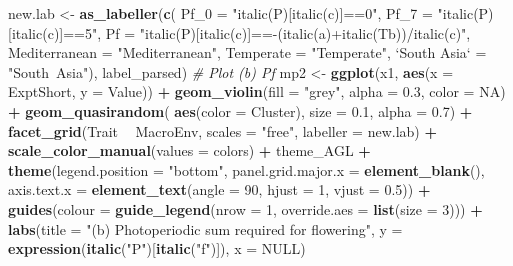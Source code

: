 \documentclass[
]{article}
\newenvironment{Shaded}{\begin{snugshade}}{\end{snugshade}}
\newcommand{\CommentTok}[1]{\textcolor[rgb]{0.56,0.35,0.01}{\textit{#1}}}
\newcommand{\DataTypeTok}[1]{\textcolor[rgb]{0.13,0.29,0.53}{#1}}
\newcommand{\DecValTok}[1]{\textcolor[rgb]{0.00,0.00,0.81}{#1}}
\newcommand{\FloatTok}[1]{\textcolor[rgb]{0.00,0.00,0.81}{#1}}
\newcommand{\KeywordTok}[1]{\textcolor[rgb]{0.13,0.29,0.53}{\textbf{#1}}}
\newcommand{\NormalTok}[1]{#1}
\newcommand{\OperatorTok}[1]{\textcolor[rgb]{0.81,0.36,0.00}{\textbf{#1}}}
\newcommand{\OtherTok}[1]{\textcolor[rgb]{0.56,0.35,0.01}{#1}}
\newcommand{\StringTok}[1]{\textcolor[rgb]{0.31,0.60,0.02}{#1}}
\begin{document}
\begin{Shaded}
\begin{Highlighting}[]
{{{{{{{{{\NormalTok{new.lab <-}\StringTok{ }\KeywordTok{as_labeller}\NormalTok{(}\KeywordTok{c}\NormalTok{(}
  \DataTypeTok{Pf_0 =} \StringTok{"italic(P)[italic(c)]==0"}\NormalTok{, }\DataTypeTok{Pf_7 =} \StringTok{"italic(P)[italic(c)]==5"}\NormalTok{,}
  \DataTypeTok{Pf =} \StringTok{"italic(P)[italic(c)]==-(italic(a)+italic(Tb))/italic(c)"}\NormalTok{,}
  \DataTypeTok{Mediterranean =} \StringTok{"Mediterranean"}\NormalTok{, }\DataTypeTok{Temperate =} \StringTok{"Temperate"}\NormalTok{, }
  \StringTok{`}\DataTypeTok{South Asia}\StringTok{`}\NormalTok{ =}\StringTok{ "South~Asia"}\NormalTok{), label_parsed)}
\CommentTok{# Plot (b) Pf}
\NormalTok{mp2 <-}\StringTok{ }\KeywordTok{ggplot}\NormalTok{(x1, }\KeywordTok{aes}\NormalTok{(}\DataTypeTok{x =}\NormalTok{ ExptShort, }\DataTypeTok{y =}\NormalTok{ Value)) }\OperatorTok{+}
\StringTok{  }\KeywordTok{geom_violin}\NormalTok{(}\DataTypeTok{fill =} \StringTok{"grey"}\NormalTok{, }\DataTypeTok{alpha =} \FloatTok{0.3}\NormalTok{, }\DataTypeTok{color =} \OtherTok{NA}\NormalTok{) }\OperatorTok{+}\StringTok{ }
\StringTok{  }\KeywordTok{geom_quasirandom}\NormalTok{( }\KeywordTok{aes}\NormalTok{(}\DataTypeTok{color =}\NormalTok{ Cluster), }\DataTypeTok{size =} \FloatTok{0.1}\NormalTok{, }\DataTypeTok{alpha =} \FloatTok{0.7}\NormalTok{) }\OperatorTok{+}\StringTok{ }
\StringTok{  }\KeywordTok{facet_grid}\NormalTok{(Trait }\OperatorTok{~}\StringTok{ }\NormalTok{MacroEnv, }\DataTypeTok{scales =} \StringTok{"free"}\NormalTok{, }\DataTypeTok{labeller =}\NormalTok{ new.lab) }\OperatorTok{+}
\StringTok{  }\KeywordTok{scale_color_manual}\NormalTok{(}\DataTypeTok{values =}\NormalTok{ colors) }\OperatorTok{+}
\StringTok{  }\NormalTok{theme_AGL }\OperatorTok{+}
\StringTok{  }\KeywordTok{theme}\NormalTok{(}\DataTypeTok{legend.position =} \StringTok{"bottom"}\NormalTok{,}
        \DataTypeTok{panel.grid.major.x =} \KeywordTok{element_blank}\NormalTok{(),}
        \DataTypeTok{axis.text.x =} \KeywordTok{element_text}\NormalTok{(}\DataTypeTok{angle =} \DecValTok{90}\NormalTok{, }\DataTypeTok{hjust =} \DecValTok{1}\NormalTok{, }\DataTypeTok{vjust =} \FloatTok{0.5}\NormalTok{)) }\OperatorTok{+}
\StringTok{  }\KeywordTok{guides}\NormalTok{(}\DataTypeTok{colour =} \KeywordTok{guide_legend}\NormalTok{(}\DataTypeTok{nrow =} \DecValTok{1}\NormalTok{, }\DataTypeTok{override.aes =} \KeywordTok{list}\NormalTok{(}\DataTypeTok{size =} \DecValTok{3}\NormalTok{))) }\OperatorTok{+}
\StringTok{  }\KeywordTok{labs}\NormalTok{(}\DataTypeTok{title =} \StringTok{"(b) Photoperiodic sum required for flowering"}\NormalTok{, }
       \DataTypeTok{y =} \KeywordTok{expression}\NormalTok{(}\KeywordTok{italic}\NormalTok{(}\StringTok{"P"}\NormalTok{)[}\KeywordTok{italic}\NormalTok{(}\StringTok{"f"}\NormalTok{)]), }\DataTypeTok{x =} \OtherTok{NULL}\NormalTok{)}

}}}}}}}}}
\end{Highlighting}
\end{Shaded}
\end{document}
